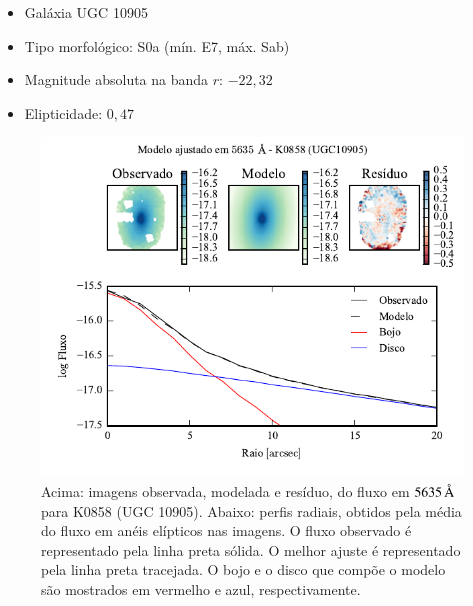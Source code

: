 \begin{itemize}
  \item Galáxia UGC 10905
  \item Tipo morfológico: S0a (mín. E7, máx. Sab)
  \item Magnitude absoluta na banda $r$: $-22,32$
  \item Elipticidade: $0,47$
\end{itemize}

\begin{figure}
	\includegraphics[page=1]{figuras-decomp/K0858_sample006a}
	\caption[Ajuste morfológico em $5635\,\angstrom$ de K0858 (UGC 10905)]
	{Acima: imagens observada, modelada e resíduo, do fluxo em $5635\,\angstrom$
	para K0858 (UGC 10905). Abaixo: perfis radiais, obtidos pela média do fluxo em
	anéis elípticos nas imagens. O fluxo observado é representado pela linha preta
	sólida. O melhor ajuste é representado pela linha preta tracejada. O bojo e o
	disco que compõe o modelo são mostrados em vermelho e azul, respectivamente.}
	\label{fig:decompRadprof:K0858}
\end{figure}

